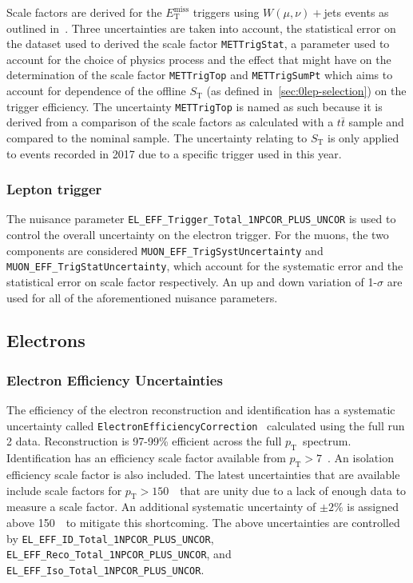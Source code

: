 Scale factors are derived for the $E_{\mathrm{T}}^{\text{miss}}$ triggers using
$W(\mu,\nu)+$jets events as outlined in~\cite{VHObjectNote2019}. Three
uncertainties are taken into account, the statistical error on the dataset used
to derived the scale factor \texttt{METTrigStat}, a parameter used to account
for the choice of physics process and the effect that might have on the
determination of the scale factor \texttt{METTrigTop} and \texttt{METTrigSumPt}
which aims to account for dependence of the offline $S_{\mathrm{T}}$ (as defined
in~\ref{sec:0lep-selection}) on the trigger efficiency. The uncertainty
\texttt{METTrigTop} is named as such because it is derived from a comparison of
the scale factors as calculated with a $t\bar{t}$ sample and compared to the
nominal sample. The uncertainty relating to $S_{\mathrm{T}}$ is only applied to
events recorded in 2017 due to a specific trigger used in this year.

\subsubsection{Lepton trigger}

The nuisance parameter \texttt{EL\_EFF\_Trigger\_Total\_1NPCOR\_PLUS\_UNCOR} is
used to control the overall uncertainty on the electron trigger. For the muons,
the two components are considered \texttt{MUON\_EFF\_TrigSystUncertainty} and
\texttt{MUON\_EFF\_TrigStatUncertainty}, which account for the systematic error
and the statistical error on scale factor respectively. An up and down variation
of 1-$\sigma$ are used for all of the aforementioned nuisance parameters.

\subsection{Electrons}

\subsubsection{Electron Efficiency Uncertainties}

The efficiency of the electron reconstruction and identification has a
systematic uncertainty called
\texttt{ElectronEfficiencyCorrection}~\cite{electronTWiki} calculated using the
full run 2 data. Reconstruction is 97-99\% efficient across the full
$p_{\mathrm{T}}$~spectrum. Identification has an efficiency scale factor
available from $p_{\mathrm{T}}>7$~\GeV. An isolation efficiency scale factor is
also included. The latest uncertainties that are available include scale factors
for $p_{\mathrm{T}}>150$~\GeV\ that are unity due to a lack of enough data to
measure a scale factor. An additional systematic uncertainty of $\pm 2\%$ is
assigned above 150~\GeV\ to mitigate this shortcoming. The above uncertainties
are controlled by \texttt{EL\_EFF\_ID\_Total\_1NPCOR\_PLUS\_UNCOR},
\texttt{EL\_EFF\_Reco\_Total\_1NPCOR\_PLUS\_UNCOR}, and
\texttt{EL\_EFF\_Iso\_Total\_1NPCOR\_PLUS\_UNCOR}.

